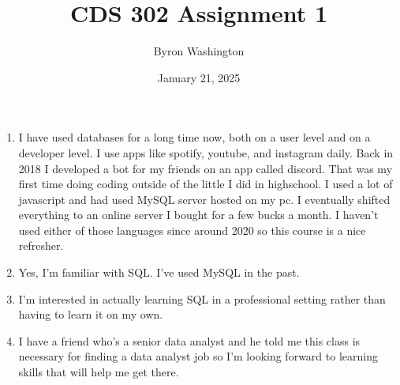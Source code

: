 \documentclass{article}
\title{CDS 302 Assignment 1}
\author{Byron Washington}
\date{January 21, 2025}
\begin{document}
\maketitle
\begin{enumerate}
    \item I have used databases for a long time now, both on a user level and on a developer level. I use apps like spotify, youtube, and instagram daily. Back in 2018 I developed a bot for my friends on an app called discord. That was my first time doing coding outside of the little I did in highschool. I used a lot of javascript and had used MySQL server hosted on my pc. I eventually shifted everything to an online server I bought for a few bucks a month. I haven't used either of those languages since around 2020 so this course is a nice refresher.
    \item Yes, I'm familiar with SQL. I've used MySQL in the past.
    \item I'm interested in actually learning SQL in a professional setting rather than having to learn it on my own.
    \item I have a friend who's a senior data analyst and he told me this class is necessary for finding a data analyst job so I'm looking forward to learning skills that will help me get there.
\end{enumerate}
\end{document}
